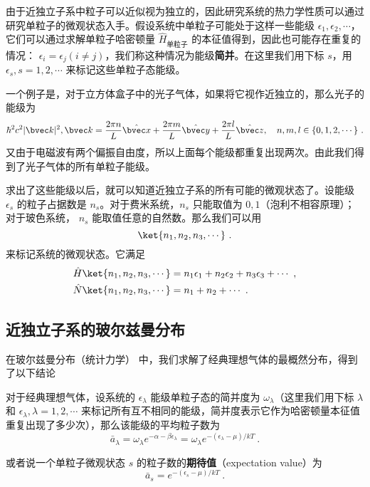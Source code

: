 由于近独立子系中粒子可以近似视为独立的，因此研究系统的热力学性质可以通过研究单粒子的微观状态入手。假设系统中单粒子可能处于这样一些能级 $\epsilon_1,\epsilon_2,\cdots$，它们可以通过求解单粒子哈密顿量 $\hat H_\text{单粒子}$ 的本征值得到，因此也可能存在重复的情况： $\epsilon_i=\epsilon_j(i\neq j)$，我们称这种情况为能级\textbf{简并}。在这里我们用下标 $s$，用 $\epsilon_s,s=1,2,\cdots$ 来标记这些单粒子态能级。

一个例子是，对于立方体盒子中的光子气体，如果将它视作近独立的，那么光子的能级为
\begin{equation}
\hbar^2c^2 |\bvec k|^2,\bvec k=\frac{2\pi n}{L}\hat{\bvec x}+\frac{2\pi m}{L}\hat{\bvec y}+\frac{2\pi l}{L}\hat{\bvec z},\quad n,m,l\in \{0,1,2,\cdots\}~.
\end{equation}
又由于电磁波有两个偏振自由度，所以上面每个能级都重复出现两次。由此我们得到了光子气体的所有单粒子能级。

求出了这些能级以后，就可以知道近独立子系的所有可能的微观状态了。设能级 $\epsilon_s$ 的粒子占据数是 $n_s$。对于费米系统，$n_s$ 只能取值为 $0,1$（泡利不相容原理）；对于玻色系统， $n_s$ 能取值任意的自然数。那么我们可以用
\begin{equation}
\ket{n_1,n_2,n_3,\cdots}~.
\end{equation}
来标记系统的微观状态。它满足
\begin{equation}
\begin{aligned}
&\hat H\ket{n_1,n_2,n_3,\cdots} = n_1 \epsilon_1 +n_2\epsilon_2 + n_3 \epsilon_3 + \cdots~,\\
&\hat N\ket{n_1,n_2,n_3,\cdots} =n_1+n_2+\cdots ~.
\end{aligned}
\end{equation}




\subsection{近独立子系的玻尔兹曼分布}
在玻尔兹曼分布（统计力学） 中，我们求解了经典理想气体的最概然分布，得到了以下结论
\begin{theorem}{}
对于经典理想气体，设系统的 $\epsilon_\lambda$ 能级单粒子态的简并度为 $\omega_\lambda$（这里我们用下标 $\lambda$ 和 $\epsilon_\lambda,\lambda=1,2,\cdots$ 来标记所有互不相同的能级，简并度表示它作为哈密顿量本征值重复出现了多少次），那么该能级的平均粒子数为
\begin{equation}
\bar a_\lambda = \omega_\lambda e^{-\alpha-\beta\epsilon_\lambda}=
\omega_\lambda e^{-(\epsilon_\lambda-\mu)/kT}~.
\end{equation}


或者说一个单粒子微观状态 $s$ 的粒子数的\textbf{期待值}（expectation value）为
\begin{equation}
\bar a_s= e^{-(\epsilon_s-\mu)/kT}~.
\end{equation}
\end{theorem}

